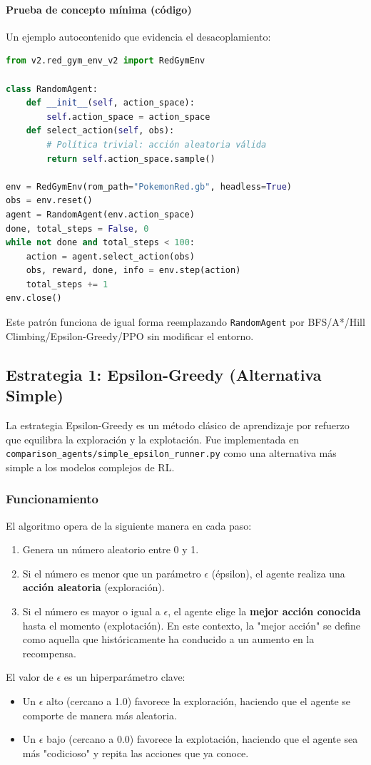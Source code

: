 \documentclass[12pt, oneside, openany]{book}
\begin{document}
\paragraph{Prueba de concepto mínima (código)} Un ejemplo autocontenido que evidencia el desacoplamiento:
\begin{lstlisting}[language=Python, caption={Runner mínimo con separación agente-entorno}, label={lst:runner_minimo}]
from v2.red_gym_env_v2 import RedGymEnv

class RandomAgent:
    def __init__(self, action_space):
        self.action_space = action_space
    def select_action(self, obs):
        # Política trivial: acción aleatoria válida
        return self.action_space.sample()

env = RedGymEnv(rom_path="PokemonRed.gb", headless=True)
obs = env.reset()
agent = RandomAgent(env.action_space)
done, total_steps = False, 0
while not done and total_steps < 100:
    action = agent.select_action(obs)
    obs, reward, done, info = env.step(action)
    total_steps += 1
env.close()
\end{lstlisting}
Este patrón funciona de igual forma reemplazando \texttt{RandomAgent} por BFS/A*/Hill Climbing/Epsilon-Greedy/PPO sin modificar el entorno.

\subsection{Estrategia 1: Epsilon-Greedy (Alternativa Simple)}
La estrategia Epsilon-Greedy es un método clásico de aprendizaje por refuerzo que equilibra la exploración y la explotación. Fue implementada en \texttt{comparison\_agents/simple\_epsilon\_runner.py} como una alternativa más simple a los modelos complejos de RL.

\subsubsection{Funcionamiento}
El algoritmo opera de la siguiente manera en cada paso:
\begin{enumerate}
    \item Genera un número aleatorio entre 0 y 1.
    \item Si el número es menor que un parámetro $\epsilon$ (épsilon), el agente realiza una \textbf{acción aleatoria} (exploración).
    \item Si el número es mayor o igual a $\epsilon$, el agente elige la \textbf{mejor acción conocida} hasta el momento (explotación). En este contexto, la "mejor acción" se define como aquella que históricamente ha conducido a un aumento en la recompensa.
\end{enumerate}
El valor de $\epsilon$ es un hiperparámetro clave:
\begin{itemize}
    \item Un $\epsilon$ alto (cercano a 1.0) favorece la exploración, haciendo que el agente se comporte de manera más aleatoria.
    \item Un $\epsilon$ bajo (cercano a 0.0) favorece la explotación, haciendo que el agente sea más "codicioso" y repita las acciones que ya conoce.
\end{itemize}
\end{document}
